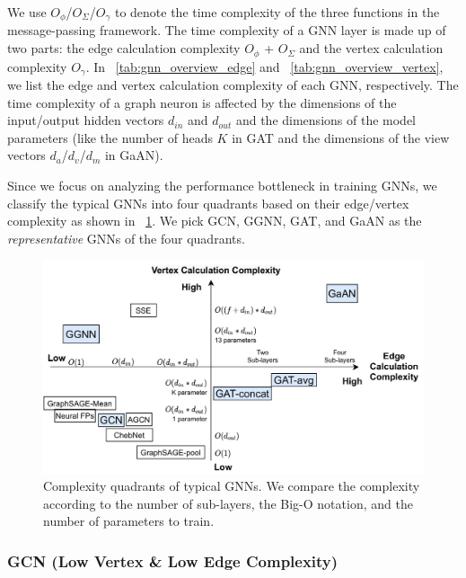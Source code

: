 We use $O_\phi$/$O_\Sigma$/$O_\gamma$ to denote the time complexity of the three functions in the message-passing framework.
The time complexity of a GNN layer is made up of two parts: the edge calculation complexity $O_\phi$ + $O_\Sigma$ and the vertex calculation complexity $O_\gamma$.
%
In \tablename~\ref{tab:gnn_overview_edge} and \tablename~\ref{tab:gnn_overview_vertex}, we list the edge and vertex calculation complexity of each GNN, respectively.
The time complexity of a graph neuron is affected by the dimensions of the input/output hidden vectors $d_{in}$ and $d_{out}$ and the dimensions of the model parameters (like the number of heads $K$ in GAT and the dimensions of the view vectors $d_a$/$d_v$/$d_m$ in GaAN).

Since we focus on analyzing the performance bottleneck in training GNNs, we classify the typical GNNs into four quadrants based on their edge/vertex complexity as shown in \figurename~\ref{fig:gnn_complexity_quadrant}. We pick GCN, GGNN, GAT, and GaAN as the \emph{representative} GNNs of the four quadrants.

\begin{figure}[h]
    \centering
    \includegraphics[width=0.8\columnwidth]{figs/illustration/GNN_complexity_quadrant.pdf}
    \caption{Complexity quadrants of typical GNNs. We compare the complexity according to the number of sub-layers, the Big-O notation, and the number of parameters to train.}
    \label{fig:gnn_complexity_quadrant}
\end{figure}

\subsubsection{GCN (Low Vertex \& Low Edge Complexity)}

